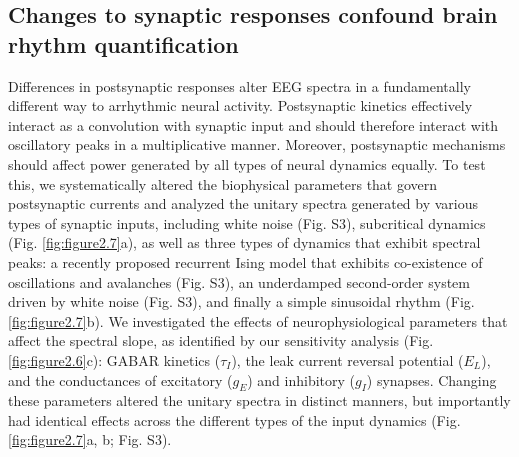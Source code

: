 \subsection{Changes to synaptic responses confound brain rhythm quantification}
Differences in postsynaptic responses alter EEG spectra in a fundamentally different way to arrhythmic neural activity. Postsynaptic kinetics effectively interact as a convolution with synaptic input and should therefore interact with oscillatory peaks in a multiplicative manner. Moreover, postsynaptic mechanisms should affect power generated by all types of neural dynamics equally. To test this, we systematically altered the biophysical parameters that govern postsynaptic currents and analyzed the unitary spectra generated by various types of synaptic inputs, including white noise (Fig. S3), subcritical dynamics (Fig. \ref{fig:figure2.7}a), as well as three types of dynamics that exhibit spectral peaks: a recently proposed recurrent Ising model that exhibits co-existence of oscillations and avalanches\cite{Lombardi2023} (Fig. S3), an underdamped second-order system driven by white noise (Fig. S3), and finally a simple sinusoidal rhythm (Fig. \ref{fig:figure2.7}b). We investigated the effects of neurophysiological parameters that affect the spectral slope, as identified by our sensitivity analysis (Fig. \ref{fig:figure2.6}c): GABAR kinetics ($\tau_I$), the leak current reversal potential ($E_L$), and the conductances of excitatory ($g_E$) and inhibitory ($g_I$) synapses. Changing these parameters altered the unitary spectra in distinct manners, but importantly had identical effects across the different types of the input dynamics (Fig. \ref{fig:figure2.7}a, b; Fig. S3). 



